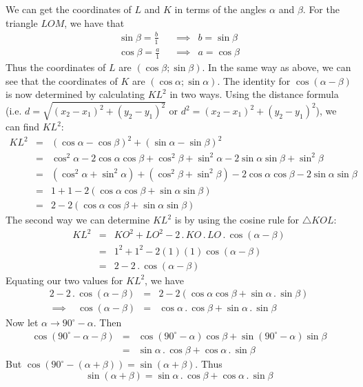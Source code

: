 We can get the coordinates of $L$ and $K$ in terms of the angles $\alpha$ and $\beta$.
For the triangle $LOM$, we have that
\begin{eqnarray*}
\sin\beta =\frac{b}{1} \ \ \ \ &\implies& b=\sin\beta\\
\cos\beta=\frac{a}{1} \ \ \ \ &\implies&a=\cos\beta
\end{eqnarray*}
Thus the coordinates of $L$ are $(\cos\beta;\sin\beta)$. In the same way as above, we can see that the coordinates of $K$ are $(\cos\alpha;\sin\alpha)$.
The identity for $\cos(\alpha-\beta)$ is now determined by calculating $KL^2$ in two ways. Using the distance formula (i.e. $d=\sqrt{(x_2-x_1)^2+(y_2-y_1)^2}$ or $d^2=(x_2-x_1)^2+(y_2-y_1)^2$), we can find $KL^2$:
\begin{eqnarray*}
KL^2&=&(\cos\alpha-\cos\beta)^2+(\sin\alpha-\sin\beta)^2\\
&=&\cos^2\alpha-2\cos\alpha\cos\beta+\cos^2\beta+\sin^2\alpha-2\sin\alpha\sin\beta+\sin^2\beta\\
&=&(\cos^2\alpha+\sin^2\alpha)+(\cos^2\beta+\sin^2\beta)-2\cos\alpha\cos\beta-2\sin\alpha\sin\beta\\
&=&1+1-2(\cos\alpha\cos\beta+\sin\alpha\sin\beta)\\
&=&2-2(\cos\alpha\cos\beta+\sin\alpha\sin\beta)
\end{eqnarray*} 
The second way we can determine $KL^2$ is by using the cosine rule for $\triangle KOL$:
\begin{eqnarray*}
KL^2&=&KO^2+LO^2-2\,.\, KO\,.\, LO\,.\,\cos(\alpha-\beta)\\
&=&1^2+1^2-2(1)(1)\cos(\alpha-\beta)\\
&=&2-2\,.\,\cos(\alpha-\beta)
\end{eqnarray*}
Equating our two values for $KL^2$, we have
\begin{eqnarray*}
2-2\,.\,\cos(\alpha-\beta)&=&2-2(\cos\alpha\cos\beta+\sin\alpha\,.\,\sin\beta)\\
\implies \ \ \ \ \cos(\alpha-\beta)&=&\cos\alpha\,.\,\cos\beta+\sin\alpha\,.\,\sin\beta
\end{eqnarray*}
Now let $\alpha\to 90^\circ -\alpha$. Then 
\begin{eqnarray*}
\cos(90^\circ-\alpha-\beta)&=&\cos(90^\circ-\alpha)\cos\beta+\sin(90^\circ-\alpha)\sin\beta\\
&=&\sin\alpha\,.\,\cos\beta+\cos\alpha\,.\,\sin\beta
\end{eqnarray*}
But $\cos(90^\circ-(\alpha+\beta))=\sin(\alpha+\beta)$. Thus 
$$\sin(\alpha+\beta)=\sin\alpha\,.\,\cos\beta+\cos\alpha\,.\,\sin\beta$$

